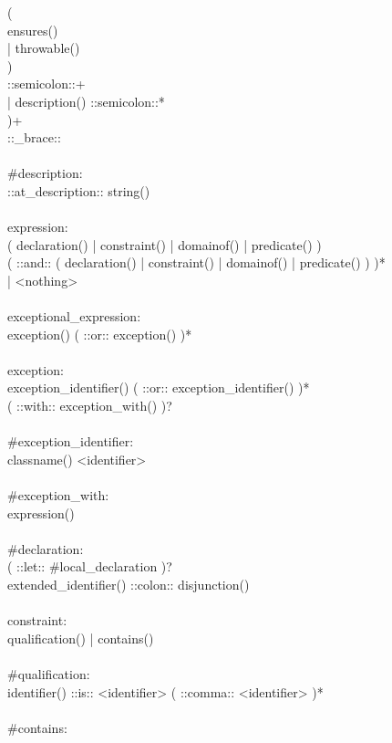 \begin{bigbigpre}
        ( \\
            ensures() \\
          | throwable() \\
        ) \\
        ::semicolon::+ \\
      | description() ::semicolon::* \\
    )+ \\
    ::_brace:: \\
 \\
#description: \\
    ::at_description:: string() \\
 \\
expression: \\
              ( declaration() | constraint() | domainof() | predicate() ) \\
    ( ::and:: ( declaration() | constraint() | domainof() | predicate() ) )* \\
  | <nothing> \\
 \\
exceptional_expression: \\
    exception() ( ::or:: exception() )* \\
 \\
exception: \\
    exception_identifier() ( ::or:: exception_identifier() )* \\
    ( ::with:: exception_with() )? \\
 \\
#exception_identifier: \\
    classname() <identifier> \\
 \\
#exception_with: \\
    expression() \\
 \\
#declaration: \\
    ( ::let:: #local_declaration )? \\
    extended_identifier() ::colon:: disjunction() \\
 \\
constraint: \\
    qualification() | contains() \\
 \\
#qualification: \\
    identifier() ::is:: <identifier> ( ::comma:: <identifier> )* \\
 \\
#contains: \\

\end{bigbigpre}
